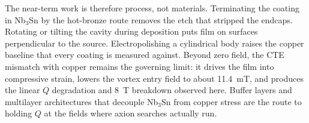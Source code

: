 

The near-term work is therefore process, not materials. Terminating the coating in Nb$_3$Sn by the hot-bronze route removes the etch that stripped the endcaps. Rotating or tilting the cavity during deposition puts film on surfaces perpendicular to the source. Electropolishing a cylindrical body raises the copper baseline that every coating is measured against. Beyond zero field, the CTE mismatch with copper remains the governing limit: it drives the film into compressive strain, lowers the vortex entry field to about \qty{11.4}{\milli\tesla}, and produces the linear $Q$ degradation and \qty{8}{\tesla} breakdown observed here. Buffer layers and multilayer architectures that decouple Nb$_3$Sn from copper stress are the route to holding $Q$ at the fields where axion searches actually run.
